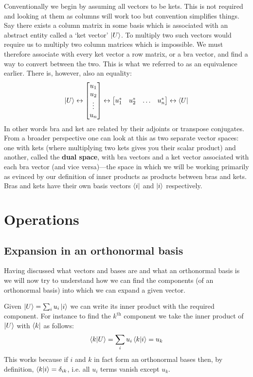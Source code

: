 \documentclass[english,seminar,headertitle]{lecture}
\begin{document}
Conventionally we begin by assuming all vectors to be kets. This is not required and looking at them as columns will work too but convention simplifies things. Say there exists a column matrix in some basis which is associated with an abstract entity called a `ket vector' $\ket{U}$. To multiply two such vectors would require us to multiply two column matrices which is impossible. We must therefore associate with every ket vector a row matrix, or a bra vector, and find a way to convert between the two. This is what we referred to as an equivalence earlier. There is, however, also an equality:
\begin{equation}
	\ket{U}
	\leftrightarrow
	\begin{bmatrix}
		u_1 \\ u_2 \\ \vdots \\ u_n
	\end{bmatrix}
	\leftrightarrow
	\begin{bmatrix}
		u_1^* & u_2^* & \ldots & u_n^*
	\end{bmatrix}
	\leftrightarrow
	\bra{U}
	\label{eq:braket-adjoint}
\end{equation}%
In other words bra and ket are related by their adjoints or transpose conjugates. From a broader perspective one can look at this as two separate vector spaces: one with kets (where multiplying two kets gives you their scalar product) and another, called the \textbf{dual space}, with bra vectors and a ket vector associated with each bra vector (and vice versa)---the space in which we will be working primarily as evinced by our definition of inner products as products between bras and kets. Bras and kets have their own basis vectors $\bra{i}$ and $\ket{i}$ respectively.

\section{Operations}

\subsection{Expansion in an orthonormal basis}

Having discussed what vectors and bases are and what an orthonormal basis is we will now try to understand how we can find the components (of an orthonormal basis) into which we can expand a given vector.

Given $\ket{U} = \sum_i u_i \ket{i}$ we can write its inner product with the required component. For instance to find the $k^\textrm{th}$ component we take the inner product of $\ket{U}$ with $\bra{k}$ as follows:
\[
	\braket{k | U} = \sum_i u_i \braket{k | i} = u_k
\]
This works because if $i$ and $k$ in fact form an orthonormal bases then, by definition, $\braket{k | i} = \delta_{ik}$, i.e. all $u_i$ terms vanish except $u_k$.
\end{document}
